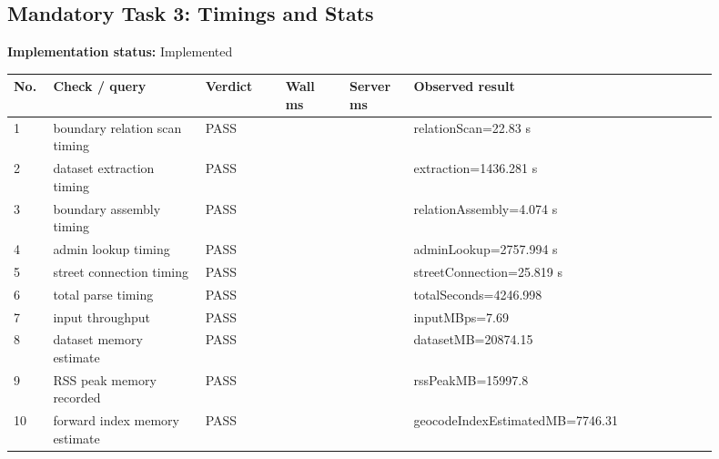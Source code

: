\documentclass[10pt,a4paper]{article}
\begin{document}
\subsection{Mandatory Task 3: Timings and Stats}
\textbf{Implementation status:} Implemented\\
\scriptsize
\begin{longtable}{|P{0.045\linewidth}|P{0.19\linewidth}|P{0.105\linewidth}|P{0.085\linewidth}|P{0.085\linewidth}|P{0.385\linewidth}|}
\hline
\textbf{No.} & \textbf{Check / query} & \textbf{Verdict} & \textbf{Wall ms} & \textbf{Server ms} & \textbf{Observed result}\\ \hline
{} 1 & boundary relation scan timing & PASS &  &  & relationScan=22.83 s\\ \hline
{} 2 & dataset extraction timing & PASS &  &  & extraction=1436.281 s\\ \hline
{} 3 & boundary assembly timing & PASS &  &  & relationAssembly=4.074 s\\ \hline
{} 4 & admin lookup timing & PASS &  &  & adminLookup=2757.994 s\\ \hline
{} 5 & street connection timing & PASS &  &  & streetConnection=25.819 s\\ \hline
{} 6 & total parse timing & PASS &  &  & totalSeconds=4246.998\\ \hline
{} 7 & input throughput & PASS &  &  & inputMBps=7.69\\ \hline
{} 8 & dataset memory estimate & PASS &  &  & datasetMB=20874.15\\ \hline
{} 9 & RSS peak memory recorded & PASS &  &  & rssPeakMB=15997.8\\ \hline
{} 10 & forward index memory estimate & PASS &  &  & geocodeIndexEstimatedMB=7746.31\\ \hline
\end{longtable}
\normalsize
\end{document}
